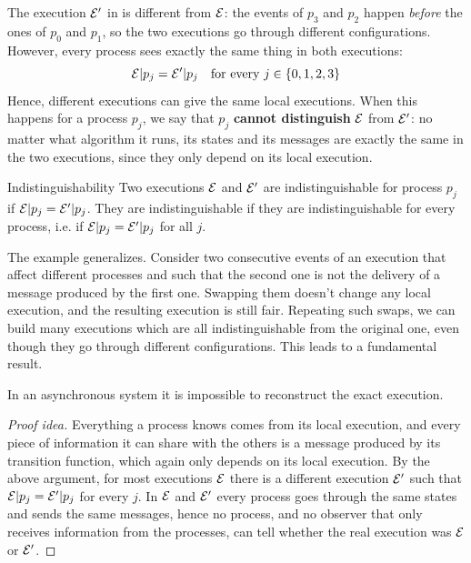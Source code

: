 The execution $\mathcal{E}'$ in  is different from $\mathcal{E}$: the events of $p_3$ and $p_2$ happen \textit{before} the ones of $p_0$ and $p_1$, so the two executions go through different configurations. However, every process sees exactly the same thing in both executions:
\[\mathcal{E}|p_j = \mathcal{E}'|p_j \quad \text{for every } j \in \{0,1,2,3\}\]
Hence, different executions can give the same local executions. When this happens for a process $p_j$, we say that $p_j$ \textbf{cannot distinguish} $\mathcal{E}$ from $\mathcal{E}'$: no matter what algorithm it runs, its states and its messages are exactly the same in the two executions, since they only depend on its local execution.

\begin{frameddefn}{Indistinguishability}
  Two executions $\mathcal{E}$ and $\mathcal{E}'$ are indistinguishable for process $p_j$ if $\mathcal{E}|p_j = \mathcal{E}'|p_j$. They are indistinguishable if they are indistinguishable for every process, i.e. if $\mathcal{E}|p_j = \mathcal{E}'|p_j$ for all $j$.
\end{frameddefn}

The example generalizes. Consider two consecutive events of an execution that affect different processes and such that the second one is not the delivery of a message produced by the first one. Swapping them doesn't change any local execution, and the resulting execution is still fair. Repeating such swaps, we can build many executions which are all indistinguishable from the original one, even though they go through different configurations. This leads to a fundamental result.

\begin{framedthm}[label={thm:no-reconstruction}]{}
  In an asynchronous system it is impossible to reconstruct the exact execution.
\end{framedthm}

\begin{proof}[Proof idea]
  Everything a process knows comes from its local execution, and every piece of information it can share with the others is a message produced by its transition function, which again only depends on its local execution. By the above argument, for most executions $\mathcal{E}$ there is a different execution $\mathcal{E}'$ such that $\mathcal{E}|p_j = \mathcal{E}'|p_j$ for every $j$. In $\mathcal{E}$ and $\mathcal{E}'$ every process goes through the same states and sends the same messages, hence no process, and no observer that only receives information from the processes, can tell whether the real execution was $\mathcal{E}$ or $\mathcal{E}'$.
\end{proof}

